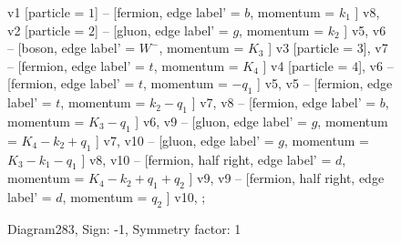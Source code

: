 \documentclass{revtex4}
\begin{document}
\begin{figure}[!htb]
\begin{center}
{    %
v1 [particle = \(1\)] -- [fermion, edge label' = \(b\), momentum = \(k_{1}\) ] v8, 
v2 [particle = \(2\)] -- [gluon, edge label' = \(g\), momentum = \(k_{2}\) ] v5, 
v6 -- [boson, edge label' = \(W^{-}\), momentum = \(K_{3}\) ] v3 [particle = \(3\)], 
v7 -- [fermion, edge label' = \(t\), momentum = \(K_{4}\) ] v4 [particle = \(4\)], 
v6 -- [fermion, edge label' = \(t\), momentum = \(-q_{1}\) ] v5, 
v5 -- [fermion, edge label' = \(t\), momentum = \(k_{2} - q_{1}\) ] v7, 
v8 -- [fermion, edge label' = \(b\), momentum = \(K_{3} - q_{1}\) ] v6, 
v9 -- [gluon, edge label' = \(g\), momentum = \(K_{4} - k_{2} + q_{1}\) ] v7, 
v10 -- [gluon, edge label' = \(g\), momentum = \(K_{3} - k_{1} - q_{1}\) ] v8, 
v10 -- [fermion, half right, edge label' = \(d\), momentum = \(K_{4} - k_{2} + q_{1} + q_{2}\) ] v9, 
v9 -- [fermion, half right, edge label' = \(d\), momentum = \(q_{2}\) ] v10, 
};
\end{center}
\caption{Diagram283, Sign: -1, Symmetry factor: 1}
\end{figure}
\newpage
\end{document}
